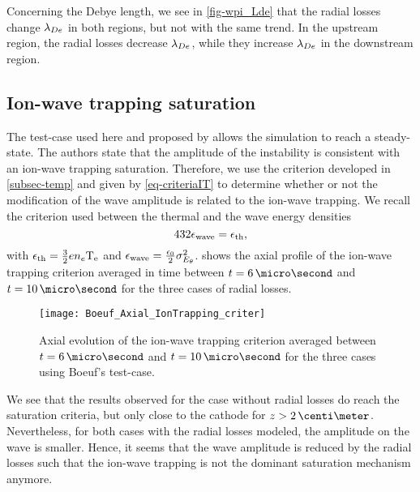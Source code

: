   Concerning the Debye length, we see in \cref{fig-wpi_Lde} that the radial losses change $\lambda_{De}$ in both regions, but not with the same trend.
  In the upstream region, the radial losses decrease $\lambda_{De}$, while they increase $\lambda_{De}$ in the downstream region.


\subsection{Ion-wave trapping saturation } \label{subsec-boeuf_iontrapping}

  The test-case used here and proposed by \citet{boeuf2018} allows the simulation to reach a steady-state.
  The authors state that the amplitude of the instability is consistent with an ion-wave trapping saturation.
  Therefore, we use the criterion developed in \cref{subsec-temp} and given by \cref{eq-criteriaIT} to determine whether or not the modification of the wave amplitude is related to the ion-wave trapping.
  We recall the criterion used between the thermal and the wave energy densities
  \begin{equation} 
    432 \epsilon_{\rm wave} = \epsilon_{\rm th},
  \end{equation}
  with $\epsilon_{\rm th} = \frac{3}{2} e n_e \mathrm{T_e}$ and $\epsilon_{\rm wave} = \frac{\epsilon_0}{2} \sigma_{E_{\theta}}^2$.
   shows the axial profile of the ion-wave trapping criterion averaged in time between $t=6\,\micro\second$ and $t=10\,\micro\second$ for the three cases of radial losses.

  \begin{figure}[hbt]
    \centering
    \texttt{[image: Boeuf\_Axial\_IonTrapping\_criter]}
    \caption{Axial evolution of the ion-wave trapping criterion averaged between $t=6\,\micro\second$ and $t=10\,\micro\second$ for the three cases using Boeuf's test-case. }
    \label{fig-ionwavetrapping_axial}
  \end{figure}

  We see that the results observed for the case without radial losses do reach the saturation criteria, but only close to the cathode for $z > 2\,\centi\meter$.
  Nevertheless, for both cases with the radial losses modeled, the amplitude on the wave is smaller.
  Hence, it seems that the wave amplitude is reduced by the radial losses such that the ion-wave trapping is not the dominant saturation mechanism anymore.



